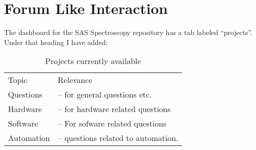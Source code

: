 \documentclass[letter,11pt,oneside]{article}
\begin{document}
\section{Forum Like Interaction}

The dashboard for the SAS Spectroscopy repository has a tab
labeled ``projects''. Under that heading I have added:

\begin{table}[h!]
\centering
\begin{tabular}{ l  l }
Topic  & Relevance   \\
Questions  & -- for general questions etc.    \\ 
Hardware   & -- for hardware related questions    \\ 
Software   & -- For sofware related questions    \\ 
Automation & -- questions related to automation.    \\ 

\end{tabular}
\caption{Projects currently available}
\label{table:ProjectTable}
\end{table}










\end{document}

